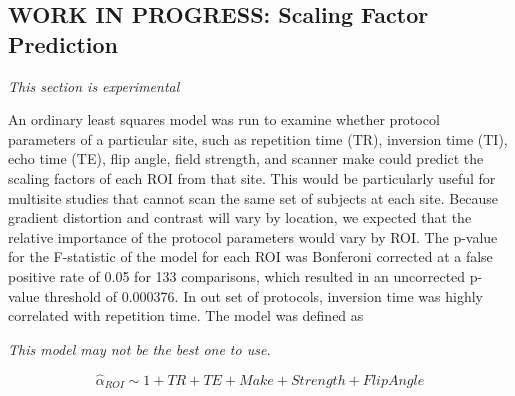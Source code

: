 \subsection{WORK IN PROGRESS: Scaling Factor Prediction}

\textit{This section is experimental}

An ordinary least squares model was run to examine whether protocol parameters of a particular site, such as repetition time (TR), inversion time (TI), echo time (TE), flip angle, field strength, and scanner make could predict the scaling factors of each ROI from that site. This would be particularly useful for multisite studies that cannot scan the same set of subjects at each site. Because gradient distortion and contrast will vary by location, we expected that the relative importance of the protocol parameters would vary by ROI. The p-value for the F-statistic of the model for each ROI was Bonferoni corrected at a false positive rate of 0.05 for 133 comparisons, which resulted in an uncorrected p-value threshold of 0.000376. In out set of protocols, inversion time was highly correlated with repetition time. The model was defined as

\textit{This model may not be the best one to use.} 

\begin{equation}
\hat{\alpha}_{ROI} \sim 1 + TR+ TE + Make + Strength + FlipAngle
\end{equation}
